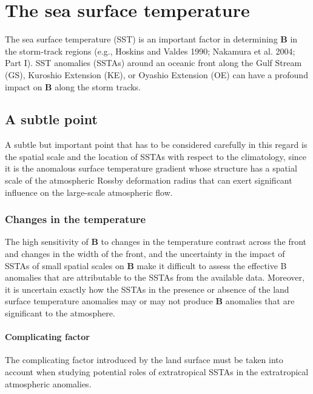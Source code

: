 \documentclass[twocol]{ametsocv6.2}
\begin{document}
\section{The sea surface temperature}
The sea surface temperature
 (SST) is an important factor
in determining $\mathbf{B}$ in the storm-track regions (e.g.,
Hoskins and Valdes 1990; Nakamura et al. 2004; Part I).
SST anomalies (SSTAs) around an oceanic front along the
Gulf Stream (GS), Kuroshio Extension (KE), or Oyashio
Extension (OE) can have a profound impact on $\mathbf{B}$ along
the storm tracks. 

\subsection{A subtle point}
A subtle but important point that has to
be considered carefully in this regard is the spatial scale
and the location of SSTAs with respect to the climatology,
since it is the anomalous surface temperature
gradient whose structure has a spatial scale of the atmospheric
Rossby deformation radius that can exert significant
influence on the large-scale atmospheric flow. 

\subsubsection{Changes in the temperature}
The
high sensitivity of $\mathbf{B}$ to changes in the temperature contrast
across the front and changes in the width of the front, and
the uncertainty in the impact of SSTAs of small spatial
scales on $\mathbf{B}$ make it difficult to assess the effective B
anomalies that are attributable to the SSTAs from the
available data. Moreover, it is uncertain exactly how the
SSTAs in the presence or absence of the land surface
temperature anomalies may or may not produce $\mathbf{B}$ anomalies
that are significant to the atmosphere. 

\paragraph{Complicating factor}The complicating
factor introduced by the land surface must be taken
into account when studying potential roles of extratropical
SSTAs in the extratropical atmospheric anomalies.
\end{document}
